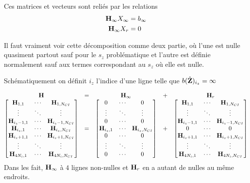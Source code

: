 Ces matrices et vecteurs sont reliés par les relations
\begin{align}
  {\mathbf{H}}_\infty X_\infty &= {b}_\infty
  \\
  {\mathbf{H}}_\infty X_r &= 0
\end{align}

Il faut vraiment voir cette décomposition comme deux partie, où l'une est nulle quasiment partout sauf pour le \(s_z\) problématique et l'autre est définie normalement sauf aux termes correspondant au \(s_z\) où elle est nulle.

Schématiquement on définit \(i_z\) l'indice d'une ligne telle que \({b}(\hat{\mathbf{Z}})_{i_z} = \infty\)

\begin{equation*}
  \begin{matrix}
    {\mathbf{H}} &=& {\mathbf{H}}_\infty &+& {\mathbf{H}}_r
    \\
    \begin{bmatrix}
      {\mathbf{H}}_{1,1} & \cdots & {\mathbf{H}}_{1,N_{CI}}
      \\
      \vdots & \ddots & \vdots
      \\
      {\mathbf{H}}_{i_z-1,1} & \cdots & {\mathbf{H}}_{i_z-1,N_{CI}}
      \\
      {\mathbf{H}}_{i_z,1} & \cdots & {\mathbf{H}}_{i_z,N_{CI}}
      \\
      {\mathbf{H}}_{i_z+1,1} & \cdots & {\mathbf{H}}_{i_z+1,N_{CI}}
      \\
      \vdots & \ddots & \vdots
      \\
      {\mathbf{H}}_{4N_i,1} & \cdots & {\mathbf{H}}_{4N_i,N_{CI}}
    \end{bmatrix}
    & = &
    \begin{bmatrix}
      0 & \cdots & 0
      \\
      \vdots & \ddots & \vdots
      \\
      0 & \cdots & 0
      \\
      {\mathbf{H}}_{i_z,1} & \cdots & {\mathbf{H}}_{i_z,N_{CI}}
      \\
      0 & \cdots & 0
      \\
      \vdots & \ddots & \vdots
      \\
      0 & \cdots & 0
    \end{bmatrix}
    & + & 
    \begin{bmatrix}
      {\mathbf{H}}_{1,1} & \cdots & {\mathbf{H}}_{1,N_{CI}}
      \\
      \vdots & \ddots & \vdots
      \\
      {\mathbf{H}}_{i_z-1,1} & \cdots & {\mathbf{H}}_{i_z-1,N_{CI}}
      \\
      0 & \cdots & 0
      \\
      {\mathbf{H}}_{i_z+1,1} & \cdots & {\mathbf{H}}_{i_z+1,N_{CI}}
      \\
      \vdots & \ddots & \vdots
      \\
      {\mathbf{H}}_{4N_i,1} & \cdots & {\mathbf{H}}_{4N_i,N_{CI}}
    \end{bmatrix}
  \end{matrix}
\end{equation*}
Dans les fait, \({\mathbf{H}}_\infty\) à \(4\) lignes non-nulles et \({\mathbf{H}}_r\) en a autant de nulles au même endroits.


